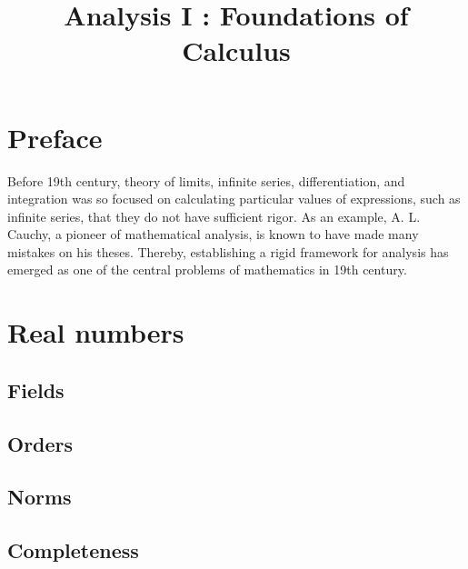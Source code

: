 \documentclass{../crs}
\title{Analysis I : Foundations of Calculus}
\begin{document}
\maketitle
\tableofcontents


\frontmatter

\chapter*{Preface}

Before 19th century, theory of limits, infinite series, differentiation, and integration was so focused on calculating particular values of expressions, such as infinite series, that they do not have sufficient rigor.
As an example, A. L. Cauchy, a pioneer of mathematical analysis, is known to have made many mistakes on his theses.
Thereby, establishing a rigid framework for analysis has emerged as one of the central problems of mathematics in 19th century.%





\mainmatter

\chapter{Real numbers}

\section{Fields}




\section{Orders}




\section{Norms}




\section{Completeness}
\end{document}

